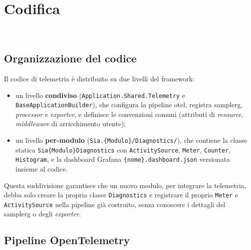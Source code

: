 \chapter{Codifica}
\label{cap:codifica}

\\

\section{Organizzazione del codice}

Il codice di telemetria è distribuito su due livelli del framework:

\begin{itemize}
      \item un livello \textbf{condiviso} (\texttt{Application.Shared.Telemetry} e
            \texttt{BaseApplicationBuilder}), che configura la pipeline \gls{otel},
            registra \gls{samplerg}, \emph{processor} e \emph{exporter}, e definisce le
            convenzioni comuni (attributi di \emph{resource}, \emph{middleware}
            di arricchimento utente);
      \item un livello \textbf{per-modulo} (\texttt{Sia.\{Modulo\}/Diagnostics/}), che contiene
            la classe statica \texttt{Sia\{Modulo\}Diagnostics} con \texttt{ActivitySource},
            \texttt{Meter}, \texttt{Counter}, \texttt{Histogram}, e la dashboard Grafana
            \texttt{\{nome\}.dashboard.json} versionata insieme al codice.
\end{itemize}
Questa suddivisione garantisce che un nuovo modulo, per integrare la telemetria, debba solo
creare la propria classe \texttt{Diagnostics} e registrare il proprio \texttt{Meter} e
\texttt{ActivitySource} nella pipeline già costruito, senza conoscere i dettagli del
\gls{samplerg} o degli \emph{exporter}.

\section{Pipeline OpenTelemetry}

